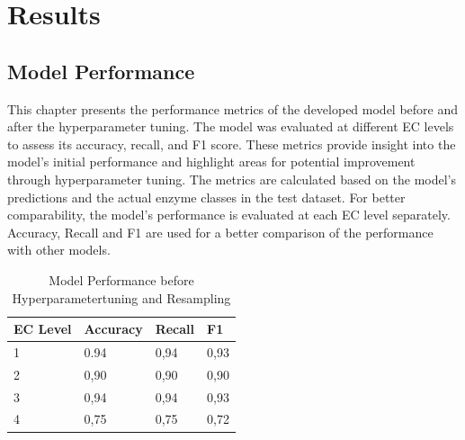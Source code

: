 \section{Results}

\subsection{Model Performance}
\label{sec:Model Performance}

This chapter presents the performance metrics of the developed model before and after the hyperparameter tuning. The model was evaluated at different EC levels to assess its accuracy, recall, and F1 score. These metrics provide insight into the model's initial performance and highlight areas for potential improvement through hyperparameter tuning. The metrics are calculated based on the model's predictions and the actual enzyme classes in the test dataset. For better comparability, the model's performance is evaluated at each EC level separately. Accuracy, Recall and F1 are used for a better comparison of the performance with other models.

\begin{table}[hbt]
    \centering
    \begin{tabular}{@{}llll@{}}
    \toprule
    \textbf{EC Level} & \textbf{Accuracy} & \textbf{Recall} & \textbf{F1} \\ \midrule
    1                 & 0.94              & 0,94            & 0,93        \\
    2                 & 0,90              & 0,90            & 0,90        \\
    3                 & 0,94              & 0,94            & 0,93        \\
    4                 & 0,75              & 0,75            & 0,72        \\ \bottomrule
    \end{tabular}
    \caption{Model Performance before Hyperparametertuning and Resampling}
    \label{tab:performance-before-tuning}
\end{table}


